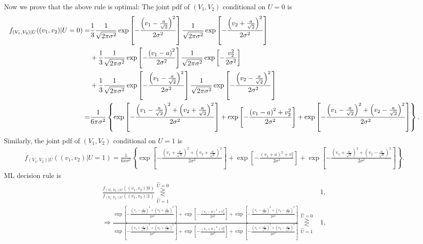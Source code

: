\documentclass{assignment}
\begin{document}
\begin{sol}
    Now we prove that the above rule is optimal: The joint pdf of $(V_1,V_2)$ conditional on $U=0$ is
    {\footnotesize
    \begin{align}
        \notag f_{(V_1,V_2)\vert U}((v_1,v_2)\vert U=0)=&\frac{1}{3}\frac{1}{\sqrt{2\pi\sigma^2}}\exp\left[-\frac{\left(v_1-\frac{a}{\sqrt{2}}\right)^2}{2\sigma^2}\right]\frac{1}{\sqrt{2\pi\sigma^2}}\exp\left[-\frac{\left(v_2+\frac{a}{\sqrt{2}}\right)^2}{2\sigma^2}\right]\\
        \notag&+\frac{1}{3}\frac{1}{\sqrt{2\pi\sigma^2}}\exp\left[-\frac{\left(v_1-a\right)^2}{2\sigma^2}\right]\frac{1}{\sqrt{2\pi\sigma^2}}\exp\left[-\frac{v_2^2}{2\sigma^2}\right]\\
        \notag&+\frac{1}{3}\frac{1}{\sqrt{2\pi\sigma^2}}\exp\left[-\frac{\left(v_1-\frac{a}{\sqrt{2}}\right)^2}{2\sigma^2}\right]\frac{1}{\sqrt{2\pi\sigma^2}}\exp\left[-\frac{\left(v_2-\frac{a}{\sqrt{2}}\right)^2}{2\sigma^2}\right]\\
        =&\frac{1}{6\pi\sigma^2}\left\{\exp\left[-\frac{\left(v_1-\frac{a}{\sqrt{2}}\right)^2+\left(v_2+\frac{a}{\sqrt{2}}\right)^2}{2\sigma^2}\right]+\exp\left[-\frac{\left(v_1-a\right)^2+v_2^2}{2\sigma^2}\right]+\exp\left[-\frac{\left(v_1-\frac{a}{\sqrt{2}}\right)^2+\left(v_2-\frac{a}{\sqrt{2}}\right)^2}{2\sigma^2}\right]\right\}.
    \end{align}
    }
    Similarly, the joint pdf of $(V_1,V_2)$ conditional on $U=1$ is
    {\footnotesize
    \begin{align}
        f_{(V_1,V_2)\vert U}((v_1,v_2)\vert U=1)=\frac{1}{6\pi\sigma^2}\left\{\exp\left[-\frac{\left(v_1+\frac{a}{\sqrt{2}}\right)^2+\left(v_2+\frac{a}{\sqrt{2}}\right)^2}{2\sigma^2}\right]+\exp\left[-\frac{\left(v_1+a\right)^2+v_2^2}{2\sigma^2}\right]+\exp\left[-\frac{\left(v_1+\frac{a}{\sqrt{2}}\right)^2+\left(v_2-\frac{a}{\sqrt{2}}\right)^2}{2\sigma^2}\right]\right\}.
    \end{align}
    }
    ML decision rule is
    \begin{align}
        \frac{f_{(V_1,V_2)\vert U}((v_1,v_2)\vert 0)}{f_{(V_1,V_2)\vert U}((v_1,v_2)\vert 1)}\overset{\hat{U}=0}{\underset{\hat{U}=1}{\gtreqless}}&1,\\
        \Longrightarrow\frac{\exp\left[-\frac{\left(v_1-\frac{a}{\sqrt{2}}\right)^2+\left(v_2+\frac{a}{\sqrt{2}}\right)^2}{2\sigma^2}\right]+\exp\left[-\frac{\left(v_1-a\right)^2+v_2^2}{2\sigma^2}\right]+\exp\left[-\frac{\left(v_1-\frac{a}{\sqrt{2}}\right)^2+\left(v_2-\frac{a}{\sqrt{2}}\right)^2}{2\sigma^2}\right]}{\exp\left[-\frac{\left(v_1+\frac{a}{\sqrt{2}}\right)^2+\left(v_2+\frac{a}{\sqrt{2}}\right)^2}{2\sigma^2}\right]+\exp\left[-\frac{\left(v_1+a\right)^2+v_2^2}{2\sigma^2}\right]+\exp\left[-\frac{\left(v_1+\frac{a}{\sqrt{2}}\right)^2+\left(v_2-\frac{a}{\sqrt{2}}\right)^2}{2\sigma^2}\right]}\overset{\hat{U}=0}{\underset{\hat{U}=1}{\gtreqless}}&1,\\

\end{align}
\end{sol}
\end{document}
